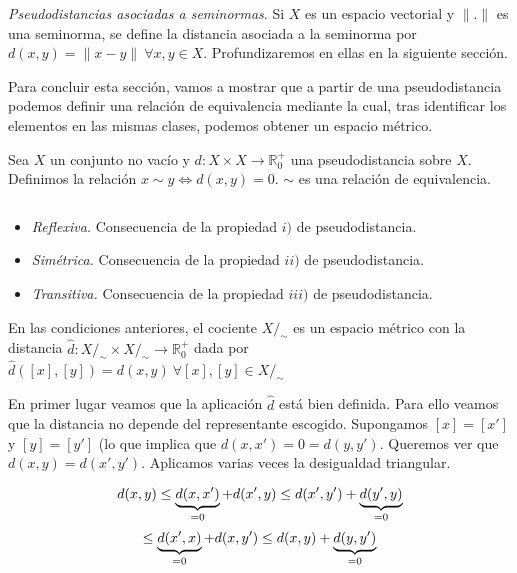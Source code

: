 \documentclass[ oneside,openany,titlepage,numbers=noenddot,headinclude,%
                footinclude=true,cleardoublepage=empty,abstractoff, %
                BCOR=5mm,paper=a4,fontsize=11pt,%
                spanish,american%
                ]{scrreprt}
\begin{document}
\examplee

\exampleb

\emph{Pseudodistancias asociadas a seminormas}. Si $X$ es un espacio vectorial y $\|.\|$ es una seminorma, se define la distancia asociada a la seminorma por $d(x,y)=\|x-y\| \ \forall x,y\in X$. Profundizaremos en ellas en la siguiente sección.

\examplee

Para concluir esta sección, vamos a mostrar que a partir de una pseudodistancia podemos definir una relación de equivalencia mediante la cual, tras identificar los elementos en las mismas clases, podemos obtener un espacio métrico.

\propb

Sea $X$ un conjunto no vacío y $d:X\times X \to \mathbb{R}^+_0$ una pseudodistancia sobre $X$. Definimos la relación $x \sim y \iff d(x,y)=0$. $\sim$ es una relación de equivalencia.

\prope

\proofb

$ $ \newline

\begin{itemize}
	
\item \emph{Reflexiva.} Consecuencia de la propiedad $i)$ de pseudodistancia.
\item \emph{Simétrica.} Consecuencia de la propiedad $ii)$ de pseudodistancia.
\item \emph{Transitiva.} Consecuencia de la propiedad $iii)$ de pseudodistancia.
\end{itemize}

\proofe

\theob

En las condiciones anteriores, el cociente $X/_\sim$ es un espacio métrico con la distancia $\hat{d}:X/_\sim \times X/_\sim \to \mathbb{R}^+_0$ dada por $\hat{d}([x],[y])=d(x,y) \ \forall[x],[y] \in X/_\sim$

\theoe

\proofb

En primer lugar veamos que la aplicación $\hat{d}$ está bien definida. Para ello veamos que la distancia no depende del representante escogido. Supongamos $[x]=[x']$ y $[y]=[y']$ (lo que implica que $d(x,x')=0=d(y,y')$. Queremos ver que $d(x,y)=d(x',y')$. Aplicamos varias veces la desigualdad triangular.

\[d(x,y)\le \underbrace{d(x,x')}_{=0}+d(x',y) \le d(x',y')+\underbrace{d(y',y)}_{=0}\]
\[\le \underbrace{d(x',x)}_{=0}+d(x,y') \le d(x,y) + \underbrace{d(y,y')}_{=0} \]
\end{document}
